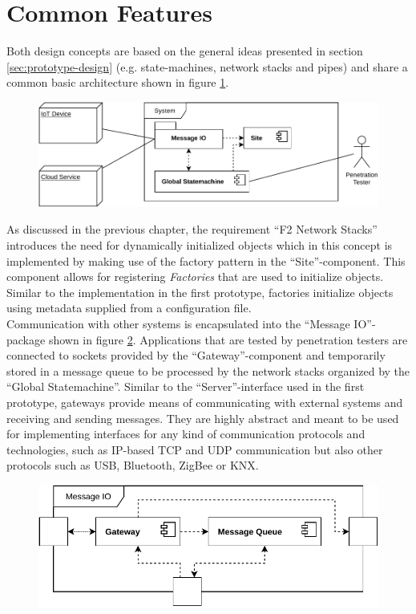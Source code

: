 \section{Common Features}
Both design concepts are based on the general ideas presented in section \ref{sec:prototype-design} (e.g. state-machines, network stacks and pipes) and share a common basic architecture shown in figure \ref{fig:component-view-1}.\\
\begin{figure}[h]
    \centering
    \includegraphics[width=12cm]{img/ch05/component-view-1.pdf}
    \label{fig:component-view-1}
\end{figure}
As discussed in the previous chapter, the requirement \enquote{F2 Network Stacks} introduces the need for dynamically initialized objects which in this concept is implemented by making use of the factory pattern in the \enquote{Site}-component. This component allows for registering \emph{Factories} that are used to initialize objects. Similar to the implementation in the first prototype, factories initialize objects using metadata supplied from a configuration file.\\
Communication with other systems is encapsulated into the \enquote{Message IO}-package shown in figure \ref{fig:component-view-2}. Applications that are tested by penetration testers are connected to sockets provided by the \enquote{Gateway}-component and temporarily stored in a message queue to be processed by the network stacks organized by the \enquote{Global Statemachine}. Similar to the \enquote{Server}-interface used in the first prototype, gateways provide means of communicating with external systems and receiving and sending messages. They are highly abstract and meant to be used for implementing interfaces for any kind of communication protocols and technologies, such as \ac{IP}-based \ac{TCP} and \ac{UDP} communication but also other protocols such as USB, Bluetooth, ZigBee or KNX.
\begin{figure}[h]
    \centering
    \includegraphics[width=12cm]{img/ch05/component-view-2-messageio.pdf}
    \label{fig:component-view-2}
\end{figure}
